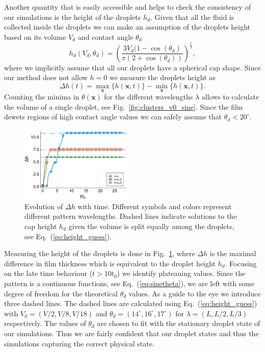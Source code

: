 \documentclass[twocolumn,amsmath,amssymb,showpacs,pre,nofootinbib,superscriptaddress]{revtex4-1} %
\begin{document}
Another quantity that is easily accessible and helps to check the consistency of our simulations is the height of the droplets $h_d$.
Given that all the fluid is collected inside the droplets we can make an assumption of the droplets height based on its volume $V_d$  and contact angle $\theta_d$ 
\begin{equation}\label{eq:height_guess}
    h_d(V_d, \theta_d) = \left(\frac{3V_d(1-\cos(\theta_d)}{\pi(2+\cos(\theta_d))}\right)^{\frac{1}{3}},
\end{equation}
where we implicitly assume that all our droplets have a spherical cap shape.
Since our method does not allow $h=0$ we measure the droplets height as~\cite{PhysRevE.100.033313}
\begin{equation}\label{eq:delta_h_measure}
    \Delta h(t) = \max_{\mathbf{x}}\{h(\mathbf{x},t)\} - \min_{\mathbf{x}}\{h(\mathbf{x},t)\}.
\end{equation}
Counting the minima in $\theta(\mathbf{x})$ for the different wavelengths $\lambda$ allows to calculate the volume of a single droplet, see Fig.~\ref{fig:clusters_v0_sine}.
Since the film dewets regions of high contact angle values we can safely assume that $\theta_d < 20^{\circ}$.
\begin{figure}
    \centering
    \includegraphics[width=0.48\textwidth]{Figures/delta_h_v0_sin_with_dash.pdf}
    \caption{Evolution of $\Delta h$ with time.
    Different symbols and colors represent different pattern wavelengths.
    Dashed lines indicate solutions to the cap height $h_d$ given the volume is split equally among the droplets, see Eq.~(\ref{eq:height_guess}).}
    \label{fig:deltah_v0_sine}
\end{figure}
Measuring the height of the droplets is done in Fig.~\ref{fig:deltah_v0_sine}, where $\Delta h$ is the maximal difference in film thickness which is equivalent to the droplet height $h_d$.
Focusing on the late time behaviour ($t > 10t_0$) we identify plateauing values. 
Since the pattern is a continuous functions, see Eq.~(\ref{eq:sinetheta}), we are left with some degree of freedom for the theoretical $\theta_d$ values. 
As a guide to the eye we introduce three dashed lines.
The dashed lines are calculated using Eq.~(\ref{eq:height_guess}) with $V_d = (V/2, V/8, V/18)$ and $\theta_d = (14^{\circ}, 16^{\circ}, 17^{\circ})$ for $\lambda=(L,L/2,L/3)$ respectively.
The values of $\theta_d$ are chosen to fit with the stationary droplet state of our simulations.
Thus we are fairly confident that our droplet states and thus the simulations capturing the correct physical state.
\end{document}
